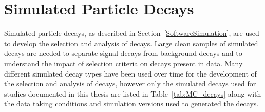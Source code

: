 \section{Simulated Particle Decays}
\label{sec:MCsamples}
Simulated particle decays, as described in Section~\ref{SoftwareSimulation}, are used to develop the selection and analysis of \bmumu decays. Large clean samples of simulated decays are needed to separate signal decays from background decays and to understand the impact of selection criteria on decays present in data. 
Many different simulated decay types have been used over time for the development of the selection and analysis of \bmumu decays, however only the simulated decays used for studies documented in this thesis are listed in Table~\ref{tab:MC_decays} along with the data taking conditions and simulation versions used to generated the decays.
